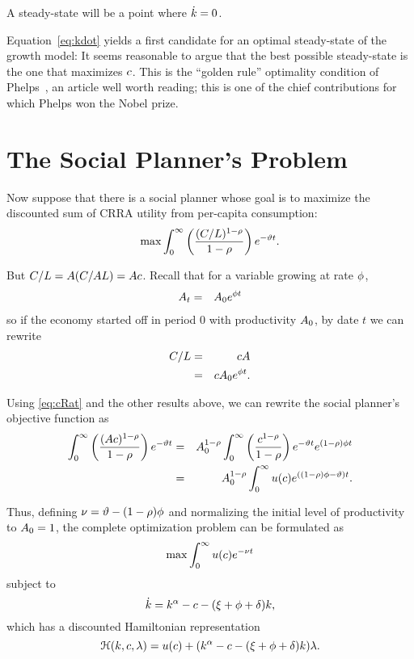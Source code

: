 \documentclass{handout}
\begin{document}
A steady-state will be a point where $\dot{{k}} = 0$.

Equation~\eqref{eq:kdot}  yields a first candidate for an optimal
steady-state of the growth model: It seems reasonable to argue that the best
possible steady-state is the one that maximizes $c$.  This is the
``golden rule'' optimality condition of
Phelps~\cite{phelps:golden}, an article well worth reading; this is
one of the chief contributions for which Phelps won the Nobel prize.

\section{The Social Planner's Problem}

Now suppose that there is a social planner whose goal is to maximize the discounted
sum of CRRA utility from per-capita consumption:
\begin{equation}
        \max \int_{0}^{\infty} \left(\frac{(C/L)^{1-\rho}}{1-\rho}\right) e^{-\vartheta  t} \label{eq:maxprob}.  
\end{equation}

But $C/L = A (C/A L)= A c$.  Recall that for a variable growing at rate $\phi$,
\begin{eqnarray}
        A _{t} & = & A _{0}e^{\phi t}
\end{eqnarray}
so if the economy started off in period 0 with productivity $A_{0}$, by date $t$ we can rewrite
\begin{eqnarray}
        C/L & = & cA   \\
         & = & cA _{0}e^{\phi t}. \label{eq:cRat}
\end{eqnarray}

Using \eqref{eq:cRat} and the other results above, we can rewrite the social planner's objective function as
\begin{eqnarray}
        \int_{0}^{\infty} \left(\frac{(A c)^{1-\rho}}{1-\rho}\right) e^{-\vartheta  t} & = & 
  A _{0}^{1-\rho}\int_{0}^{\infty} \left(\frac{c^{1-\rho}}{1-\rho}\right) e^{-\vartheta  t}e^{(1-\rho)\phi  t} 
\\ & = & A _{0}^{1-\rho}\int_{0}^{\infty} u(c) e^{\left((1-\rho)\phi -\vartheta \right) t}
.
\label{eq:maxprobmod}
\end{eqnarray}

Thus, defining $\nu = \vartheta  - (1-\rho) \phi$ and normalizing the initial
level of productivity to $A _{0}=1$, the complete optimization problem
can be formulated as
\begin{equation}
        \max \int_{0}^{\infty} u(c) e^{-\nu  t}
\end{equation}
subject to
\begin{equation}
        \dot{{k}} = {k}^{\alpha}-c-(\xi+\phi+\delta)k,
\end{equation}
which has a discounted Hamiltonian representation
\begin{equation}
        \mathcal{H}({k},c,\lambda) = u(c) + ({k}^{\alpha} - c - (\xi+\phi+\delta){k})\lambda.
\end{equation}
\end{document}
